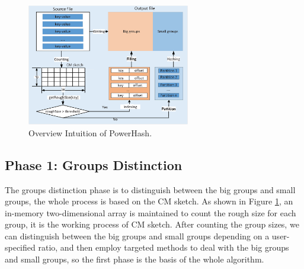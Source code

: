 \begin{figure}[htbp]
\begin{center}
\includegraphics[width=2.8in]{fig/pwhash}
\caption{Overview Intuition of PowerHash.}
\label{fig:pwHash}
\end{center}
\end{figure}





\subsection{Phase 1: Groups Distinction}%

The groups distinction phase is to distinguish between the big groups and small groups, the whole process is based on the CM sketch. As shown in Figure \ref{fig:pwHash}, an in-memory two-dimensional array is maintained to count the rough size for each group, it is the working process of CM sketch. After counting the group sizes, we can distinguish between the big groups and small groups depending on a user-specified ratio, and then employ targeted methods to deal with the big groups and small groups, so the first phase is the basis of the whole algorithm.

